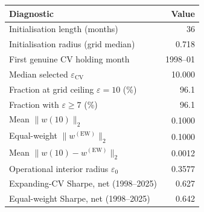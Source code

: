 \begin{tabular}{lr}
\toprule
Diagnostic & Value \\
\midrule
Initialisation length (months) & 36 \\
Initialisation radius (grid median) & 0.718 \\
First genuine CV holding month & 1998--01 \\
Median selected $\varepsilon_{\mathrm{CV}}$ & 10.000 \\
Fraction at grid ceiling $\varepsilon=10$ (\%) & 96.1 \\
Fraction with $\varepsilon\geq 7$ (\%) & 96.1 \\
Mean $\lVert w(10)\rVert_2$ & 0.1000 \\
Equal-weight $\lVert w^{(\mathrm{EW})}\rVert_2$ & 0.1000 \\
Mean $\lVert w(10)-w^{(\mathrm{EW})}\rVert_2$ & 0.0012 \\
Operational interior radius $\varepsilon_0$ & 0.3577 \\
Expanding-CV Sharpe, net (1998--2025) & 0.627 \\
Equal-weight Sharpe, net (1998--2025) & 0.642 \\
\bottomrule
\end{tabular}
